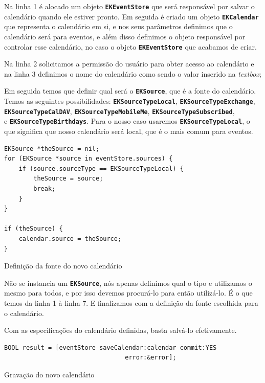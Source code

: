 \documentclass[a4paper,12pt,brazil,doubleside]{book}
\begin{document}
\begin{singlespace}
Na linha 1 é alocado um objeto \texttt{\textbf{EKEventStore}} que será responsável por salvar o calendário quando ele estiver pronto. Em seguida é criado um objeto \texttt{\textbf{EKCalendar}} que representa o calendário em si, e nos seus parâmetros definimos que o calendário será para eventos, e além disso definimos o objeto responsável por controlar esse calendário, no caso o objeto \texttt{\textbf{EKEventStore}} que acabamos de criar.

Na linha 2 solicitamos a permissão do usuário para obter acesso ao calendário e na linha 3 definimos o nome do calendário como sendo o valor inserido na \emph{textbox};

Em seguida temos que definir qual será o \texttt{\textbf{EKSource}}, que é a fonte do calendário. Temos as seguintes possibilidades: \texttt{\textbf{EKSourceTypeLocal}}, \texttt{\textbf{EKSourceTypeExchange}},\\ \texttt{\textbf{EKSourceTypeCalDAV}}, \texttt{\textbf{EKSourceTypeMobileMe}}, \texttt{\textbf{EKSourceTypeSubscribed}},\\ e \texttt{\textbf{EKSourceTypeBirthdays}}. Para o nosso caso usaremos \texttt{\textbf{EKSourceTypeLocal}}, o que significa que nosso calendário será local, que é o mais comum para eventos.

\begin{listing}[H]
\begin{verbatim}
EKSource *theSource = nil;
for (EKSource *source in eventStore.sources) {
    if (source.sourceType == EKSourceTypeLocal) {
        theSource = source;
        break;
    }
}
    
if (theSource) {
    calendar.source = theSource;
}
\end{verbatim}
\caption{Definição da fonte do novo calendário}
\end{listing}

Não se instancia um \texttt{\textbf{EKSource}}, nós apenas definimos qual o tipo e utilizamos o mesmo para todos, e por isso devemos procurá-lo para então utilizá-lo. É o que temos da linha 1 à linha 7. E finalizamos com a definição da fonte escolhida para o calendário.

Com as especificações do calendário definidas, basta salvá-lo efetivamente.

\begin{listing}[H]
\begin{verbatim}
BOOL result = [eventStore saveCalendar:calendar commit:YES
                                 error:&error];
\end{verbatim}
\caption{Gravação do novo calendário}
\end{listing}


\end{singlespace}
\end{document}
